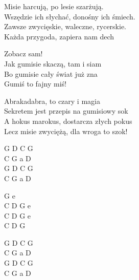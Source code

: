 \begin{text}
    Misie harcują, po lesie szarżują.\\
    Wszędzie ich słychać, donośny ich śmiech.\\
    Zawsze zwycięskie, waleczne, rycerskie.\\
    Każda przygoda, zapiera nam dech

    \vin Zobacz sam!\\
	\vin Jak gumisie skaczą, tam i siam\\
    \vin Bo gumisie cały świat już zna\\
    \vin Gumiś to fajny miś!

    Abrakadabra, to czary i magia\\
    Sekretem jest przepis na gumisiowy sok\\
    A hokus marokus, dostarcza złych pokus\\
    Lecz misie zwyciężą, dla wroga to szok!
\end{text}
\begin{chord}
    G D C G\\
    C G a D\\
    G D C G\\
    C G a D

    G e\\
	C D G e\\
    C D G e\\
    C D G

    G D C G\\
    C G a D\\
    G D C G\\
    C G a D
\end{chord}